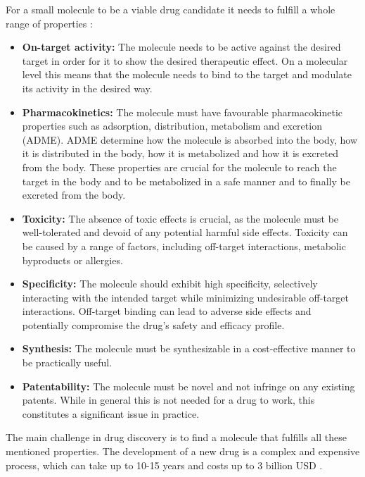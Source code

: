 For a small molecule to be a viable drug candidate it needs to fulfill a whole range of properties \citep{todo}:
\begin{itemize}
      \item \textbf{On-target activity:} The molecule needs to be active against the desired target in
            order for it to show the desired therapeutic effect. On a molecular level this means that the
            molecule needs to bind to the target and modulate its activity in the desired way.
      \item \textbf{Pharmacokinetics:} The molecule must have favourable pharmacokinetic properties
            such as adsorption, distribution, metabolism and excretion (ADME). ADME determine how the
            molecule is absorbed into the body, how it is distributed in the body, how it is metabolized and
            how it is excreted from the body. These properties are crucial for the molecule to reach the
            target in the body and to be metabolized in a safe manner and to finally be excreted from the
            body.
      \item \textbf{Toxicity:}  The absence of toxic effects is crucial, as the molecule must be
            well-tolerated and devoid of any potential harmful side effects. Toxicity can be caused by a
            range of factors, including off-target interactions, metabolic byproducts or allergies.
      \item \textbf{Specificity:}  The molecule should exhibit high specificity, selectively
            interacting with the intended target while minimizing undesirable off-target interactions.
            Off-target binding can lead to adverse side effects and potentially compromise the drug's safety
            and efficacy profile.
      \item \textbf{Synthesis:} The molecule must be synthesizable in a cost-effective manner to be
            practically useful.
      \item \textbf{Patentability:} The molecule must be novel and not infringe on any existing
            patents. While in general this is not needed for a drug to work, this constitutes a significant
            issue in practice.
\end{itemize}

The main challenge in drug discovery is to find a molecule that fulfills all these mentioned
properties. The development of a new drug is a complex and expensive process, which can take up to
10-15 years and costs up to 3 billion USD \citep{todo}.


